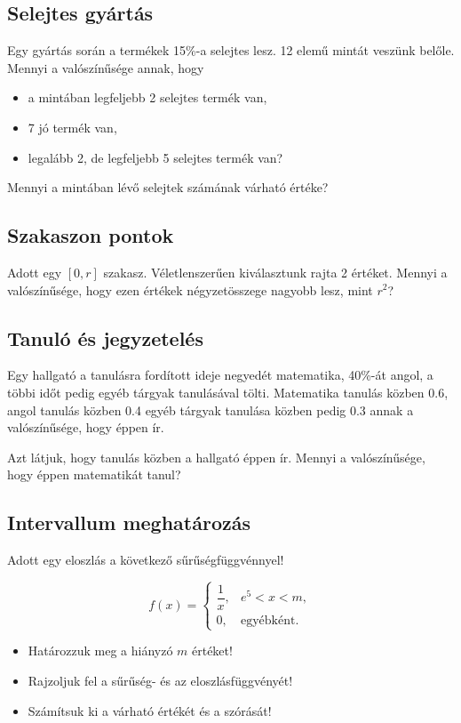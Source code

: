 \documentclass[a4paper]{article}
\begin{document}
\subsection{Selejtes gyártás}

Egy gyártás során a termékek 15\%-a selejtes lesz.
12 elemű mintát veszünk belőle.
Mennyi a valószínűsége annak, hogy
\begin{itemize}
\item a mintában legfeljebb 2 selejtes termék van,
\item 7 jó termék van,
\item legalább 2, de legfeljebb 5 selejtes termék van?
\end{itemize}
Mennyi a mintában lévő selejtek számának várható értéke?

\subsection{Szakaszon pontok}

Adott egy $[0, r]$ szakasz.
Véletlenszerűen kiválasztunk rajta 2 értéket.
Mennyi a valószínűsége, hogy ezen értékek négyzetösszege nagyobb lesz, mint $r^2$?

\subsection{Tanuló és jegyzetelés}

Egy hallgató a tanulásra fordított ideje negyedét matematika, 40\%-át angol, a többi időt pedig egyéb tárgyak tanulásával tölti.
Matematika tanulás közben 0.6, angol tanulás közben 0.4 egyéb tárgyak tanulása közben pedig 0.3 annak a valószínűsége, hogy éppen ír.

\medskip

Azt látjuk, hogy tanulás közben a hallgató éppen ír.
Mennyi a valószínűsége, hogy éppen matematikát tanul?

\subsection{Intervallum meghatározás}

Adott egy eloszlás a következő sűrűségfüggvénnyel!

\[
f(x) = \begin{cases}
\dfrac{1}{x}, & e^5 < x < m, \\
0, & \text{egyébként}.
\end{cases}
\]

\begin{itemize}
\item Határozzuk meg a hiányzó $m$ értéket!
\item Rajzoljuk fel a sűrűség- és az eloszlásfüggvényét!
\item Számítsuk ki a várható értékét és a szórását!
\end{itemize}
\end{document}
